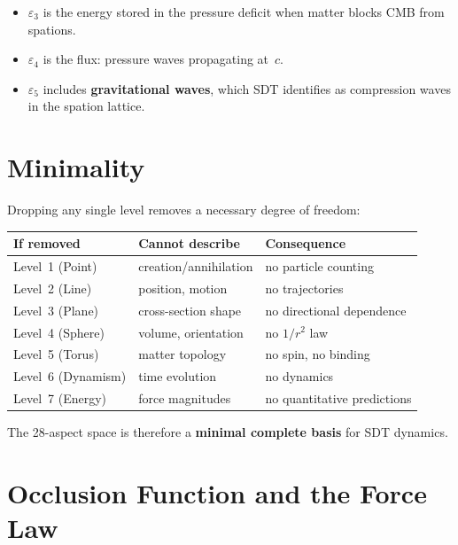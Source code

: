 \begin{itemize}
  \item $\varepsilon_3$ is the energy stored in the pressure deficit when matter blocks CMB from spations.
  \item $\varepsilon_4$ is the flux: pressure waves propagating at~$c$.
  \item $\varepsilon_5$ includes \textbf{gravitational waves}, which SDT identifies as compression waves in the spation lattice.
\end{itemize}


\section{Minimality}

Dropping any single level removes a necessary degree of freedom:

\begin{center}
\begin{tabular}{lll}
\hline
\textbf{If removed} & \textbf{Cannot describe} & \textbf{Consequence} \\
\hline
Level~1 (Point) & creation/annihilation & no particle counting \\
Level~2 (Line) & position, motion & no trajectories \\
Level~3 (Plane) & cross-section shape & no directional dependence \\
Level~4 (Sphere) & volume, orientation & no $1/r^2$ law \\
Level~5 (Torus) & matter topology & no spin, no binding \\
Level~6 (Dynamism) & time evolution & no dynamics \\
Level~7 (Energy) & force magnitudes & no quantitative predictions \\
\hline
\end{tabular}
\end{center}

\noindent The 28-aspect space is therefore a \textbf{minimal complete basis} for SDT dynamics.


\section{Occlusion Function and the Force Law}

